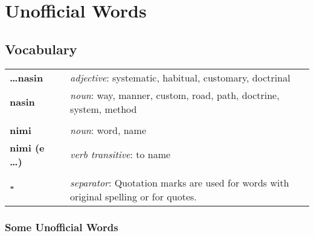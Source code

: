 
\section{Unofficial Words}
\subsection*{Vocabulary}

\begin{supertabular}{p{2,5cm}|ll}
    \textbf{\dots nasin}     &  & \textit{adjective}: systematic, habitual, customary, doctrinal                               \\
    \textbf{nasin}           &  & \textit{noun}: way, manner, custom, road, path, doctrine, system, method                     \\
                             &  &                                                                                              \\
    \textbf{nimi}            &  & \textit{noun}: word, name                                                                    \\
    \textbf{nimi (e \dots )} &  & \textit{verb transitive}: to name                                                            \\
                             &  &                                                                                              \\
    \textbf{"}               &  & \textit{separator}: Quotation marks are used for words with original spelling or for quotes. \\
\end{supertabular}

\subsubsection*{Some Unofficial Words}

